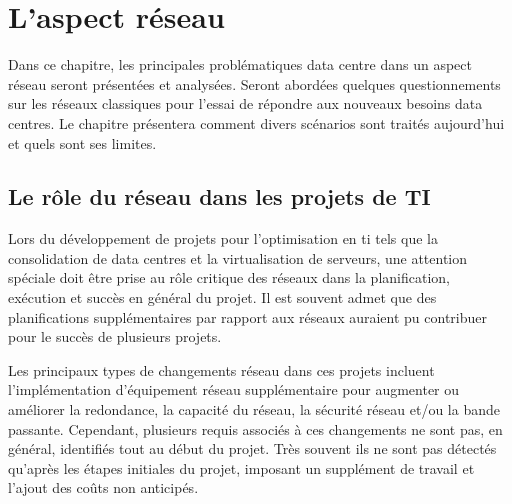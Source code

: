 


\chapter{L'aspect réseau}
Dans ce chapitre, les principales problématiques data centre dans un aspect réseau seront présentées et analysées. Seront abordées quelques questionnements sur les réseaux classiques pour l'essai de répondre aux nouveaux besoins data centres. Le chapitre présentera comment divers scénarios sont traités aujourd'hui et quels sont ses limites. 


\section{Le rôle du réseau dans les projets de TI}

Lors du développement de projets pour l'optimisation en \gls{ti} tels que la consolidation de data centres et la virtualisation de serveurs, une attention spéciale doit être prise au rôle critique des réseaux dans la planification, exécution et succès en général du projet. Il est souvent admet que des planifications supplémentaires par rapport aux réseaux auraient pu contribuer pour le succès de plusieurs projets.



Les principaux types de changements réseau dans ces projets incluent l'implémentation d'équipement réseau supplémentaire pour augmenter ou améliorer la redondance, la capacité du réseau, la sécurité réseau et/ou la bande passante. Cependant, plusieurs requis associés à ces changements ne sont pas, en général, identifiés tout au début du projet. Très souvent ils ne sont pas détectés qu'après les étapes initiales du projet, imposant un supplément de travail et l'ajout des coûts non anticipés.



